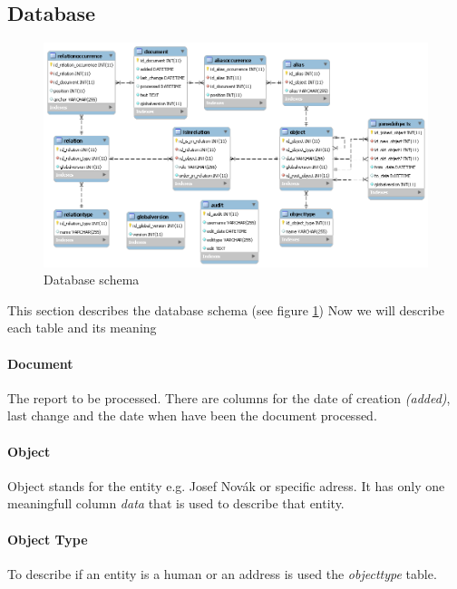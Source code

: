 
\subsection{Database}

\begin{figure}[!htb]
        \centering
        \includegraphics[width=\textwidth]{Images/db-curr}
        \caption{Database schema}
        \label{fig:DatabaseSchema}
\end{figure}

This section describes the database schema (see figure \ref{fig:DatabaseSchema})
Now we will describe each table and its meaning

\paragraph{Document} The report to be processed. There are columns for the date of creation \emph{(added)}, last change and the date when have been the document processed.

\paragraph{Object} Object stands for the entity e.g. Josef Novák or specific adress. It has only one meaningfull column \emph{data} that is used to describe that entity.

\paragraph{Object Type} To describe if an entity is a human or an address is used the \emph{objecttype} table.

